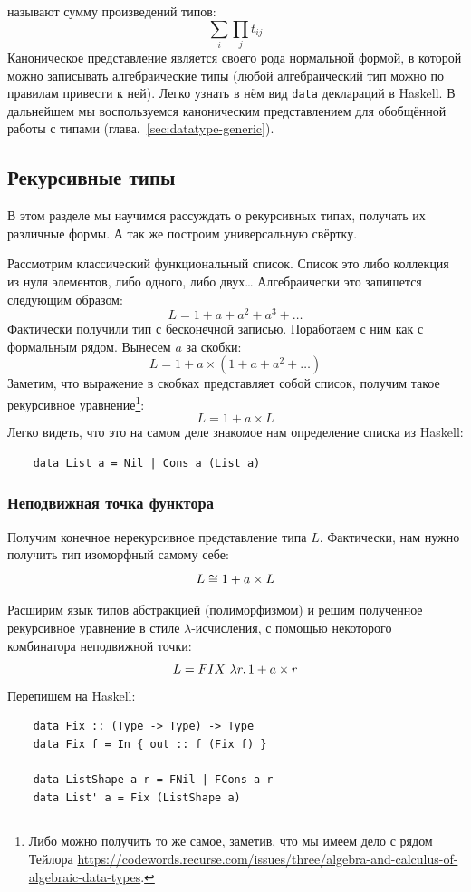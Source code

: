  называют сумму произведений типов:
\[
    \sum_{i}\prod_{j} t_{ij}
\]
Каноническое представление является своего рода нормальной формой, в которой можно записывать алгебраические типы (любой алгебраический тип можно по правилам привести к ней).
Легко узнать в нём вид \texttt{data} деклараций в Haskell.
В дальнейшем мы воспользуемся каноническим представлением для обобщённой работы с типами (глава.~\ref{sec:datatype-generic}).


\subsection{Рекурсивные типы} \label{subsec:recursive-types}

В этом разделе мы научимся рассуждать о рекурсивных типах, получать их различные формы.
А так же построим универсальную свёртку.

Рассмотрим классический функциональный список.
Список это либо коллекция из нуля элементов, либо одного, либо двух\ldots
Алгебраически это запишется следующим образом:
\[
    L = 1 + a + a^2 + a^3 + \ldots
\]
Фактически получили тип с бесконечной записью.
Поработаем с ним как с формальным рядом.
Вынесем $a$ за скобки:
\[
    L = 1 + a \times (1 + a + a^2 + \ldots)
\]
Заметим, что выражение в скобках представляет собой список, получим такое рекурсивное уравнение\footnote{Либо можно получить то же самое, заметив, что мы имеем дело с рядом Тейлора \url{https://codewords.recurse.com/issues/three/algebra-and-calculus-of-algebraic-data-types}.}:
\[
    L = 1 + a \times L
\]
Легко видеть, что это на самом деле знакомое нам определение списка из Haskell:
\begin{verbatim}
    data List a = Nil | Cons a (List a)
\end{verbatim}

\subsubsection{Неподвижная точка функтора} \label{subsubsec:functor-fixpoint}

Получим конечное нерекурсивное представление типа $L$.
Фактически, нам нужно получить тип изоморфный самому себе:
\[
    L \cong 1 + a \times L
\]

Расширим язык типов абстракцией (полиморфизмом) и решим полученное рекурсивное уравнение в стиле $\lambda$-исчисления, с помощью некоторого комбинатора неподвижной точки:
\[
    L = FIX~\lambda r\ldotp 1 + a \times r
\]
Перепишем на Haskell:
\begin{verbatim}
    data Fix :: (Type -> Type) -> Type
    data Fix f = In { out :: f (Fix f) }

    data ListShape a r = FNil | FCons a r
    data List' a = Fix (ListShape a)
\end{verbatim}

